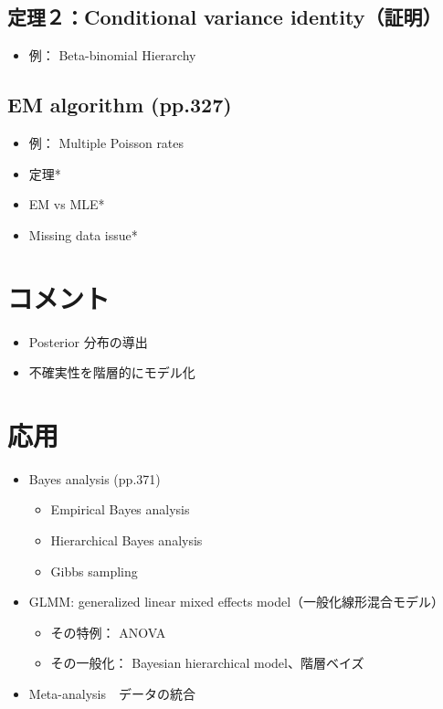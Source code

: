 \documentclass[
]{book}
\providecommand{\tightlist}{%
  \setlength{\itemsep}{0pt}\setlength{\parskip}{0pt}}
\begin{document}
\subsection{定理２：Conditional variance identity（証明）}\label{ux5b9aux7406uxff12conditional-variance-identityux8a3cux660e}

\begin{itemize}
\tightlist
\item
  例： Beta-binomial Hierarchy
\end{itemize}

\subsection{EM algorithm (pp.327)}\label{em-algorithm-pp.327}

\begin{itemize}
\tightlist
\item
  例： Multiple Poisson rates
\item
  定理*
\item
  EM vs MLE*
\item
  Missing data issue*
\end{itemize}

\section*{コメント}\label{ux30b3ux30e1ux30f3ux30c8-1}

\begin{itemize}
\tightlist
\item
  Posterior 分布の導出
\item
  不確実性を階層的にモデル化
\end{itemize}

\section*{応用}\label{ux5fdcux7528-1}

\begin{itemize}
\item
  Bayes analysis (pp.371)

  \begin{itemize}
  \tightlist
  \item
    Empirical Bayes analysis
  \item
    Hierarchical Bayes analysis
  \item
    Gibbs sampling
  \end{itemize}
\item
  GLMM: generalized linear mixed effects model（一般化線形混合モデル）

  \begin{itemize}
  \tightlist
  \item
    その特例： ANOVA
  \item
    その一般化： Bayesian hierarchical model、階層ベイズ
  \end{itemize}
\item
  Meta-analysis　データの統合
\end{itemize}
\end{document}
